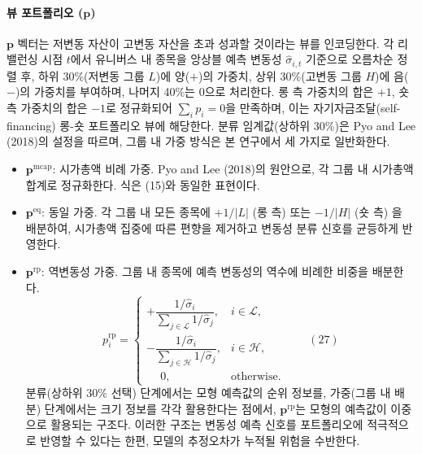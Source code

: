\documentclass{article}
\begin{document}
\paragraph{뷰 포트폴리오 ($\mathbf{p}$)}

$\mathbf{p}$ 벡터는 저변동 자산이 고변동 자산을 초과 성과할 것이라는 뷰를 인코딩한다. 각 리밸런싱 시점 $t$에서 유니버스 내 종목을 앙상블 예측 변동성 $\hat{\sigma}_{i,t}$ 기준으로 오름차순 정렬 후, 하위 30\%(저변동 그룹 $L$)에 양($+$)의 가중치, 상위 30\%(고변동 그룹 $H$)에 음($-$)의 가중치를 부여하며, 나머지 40\%는 0으로 처리한다. 롱 측 가중치의 합은 $+1$, 숏 측 가중치의 합은 $-1$로 정규화되어 $\sum_i p_i = 0$을 만족하며, 이는 자기자금조달(self-financing) 롱-숏 포트폴리오 뷰에 해당한다. 분류 임계값(상하위 30\%)은 Pyo and Lee (2018)의 설정을 따르며, 그룹 내 가중 방식은 본 연구에서 세 가지로 일반화한다.

\begin{itemize}
  \item $\mathbf{p}^{\mathrm{mcap}}$: 시가총액 비례 가중. Pyo and Lee (2018)의 원안으로, 각 그룹 내 시가총액 합계로 정규화한다. 식은 (15)와 동일한 표현이다.

  \item $\mathbf{p}^{\mathrm{eq}}$: 동일 가중. 각 그룹 내 모든 종목에 $+1/|L|$ (롱 측) 또는 $-1/|H|$ (숏 측) 을 배분하여, 시가총액 집중에 따른 편향을 제거하고 변동성 분류 신호를 균등하게 반영한다.

  \item $\mathbf{p}^{\mathrm{rp}}$: 역변동성 가중. 그룹 내 종목에 예측 변동성의 역수에 비례한 비중을 배분한다.
    \begin{equation}
      p_i^{\mathrm{rp}} =
      \begin{cases}
        +\dfrac{1/\hat{\sigma}_i}{\sum_{j \in \mathcal{L}} 1/\hat{\sigma}_j}, & i \in \mathcal{L}, \\[8pt]
        -\dfrac{1/\hat{\sigma}_i}{\sum_{j \in \mathcal{H}} 1/\hat{\sigma}_j}, & i \in \mathcal{H}, \\[6pt]
        \phantom{+}0, & \text{otherwise}.
      \end{cases} \qquad(27)\end{equation}
    분류(상하위 30\% 선택) 단계에서는 모형 예측값의 순위 정보를, 가중(그룹 내 배분) 단계에서는 크기 정보를 각각 활용한다는 점에서, $\mathbf{p}^{\mathrm{rp}}$는 모형의 예측값이 이중으로 활용되는 구조다. 이러한 구조는 변동성 예측 신호를 포트폴리오에 적극적으로 반영할 수 있다는 한편, 모델의 추정오차가 누적될 위험을 수반한다. 
\end{itemize}
\end{document}
